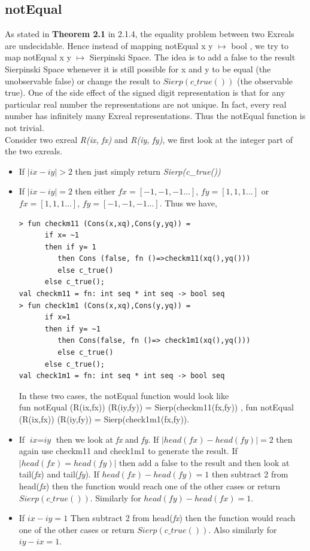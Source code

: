 \documentclass[12pt,twoside,notitlepage]{report}
\begin{document}
\subsection {notEqual}
As stated in \textbf{Theorem 2.1} in 2.1.4, the equality problem between two Exreals are undecidable. Hence instead of mapping notEqual x y $\mapsto$ bool , we try to map notEqual x y $\mapsto$ Sierpinski Space. The idea is to add a false to the result Sierpinski Space whenever it is still possible for x and y to be equal (the unobservable false) or change the result to \textit{$Sierp(c\_true())$} (the observable true). One of the side effect of the signed digit representation is that for any particular real number the representations are not unique. In fact, every real number has infinitely many Exreal representations. Thus the notEqual function is not trivial. \\
Consider two exreal \textit{R(ix, fx)} and \textit{R(iy, fy)}, we first look at the integer part of the two exreals. 
\begin{itemize}
\item If $|\textit{ix}-\textit{iy}| > 2$ then just simply return \textit{Sierp(c\_true())}
\item If $|\textit{ix}-\textit{iy}| = 2$ then either $\textit{fx} = [-1,-1,-1...]$, $\textit{fy} = [1,1,1...]$ or $\textit{fx} = [1,1,1...]$, $\textit{fy} = [-1,-1,-1...]$. 
Thus we have,

{
\begin{verbatim}
> fun checkm11 (Cons(x,xq),Cons(y,yq)) = 
      if x= ~1 
      then if y= 1 
         then Cons (false, fn ()=>checkm11(xq(),yq()))
         else c_true()
      else c_true();
val checkm11 = fn: int seq * int seq -> bool seq
> fun check1m1 (Cons(x,xq),Cons(y,yq)) = 
      if x=1 
      then if y= ~1 
         then Cons(false, fn ()=> check1m1(xq(),yq()))
         else c_true()
      else c_true();
val check1m1 = fn: int seq * int seq -> bool seq
\end{verbatim}
}

In these two cases, the notEqual function would look like \\
fun notEqual (R(ix,fx)) (R(iy,fy)) = Sierp(checkm11(fx,fy)) , fun notEqual (R(ix,fx)) (R(iy,fy)) = Sierp(check1m1(fx,fy)).
\item If $\textit{ix} = \textit{iy}$ then we look at \textit{fx} and \textit{fy}. If $|head(\textit{fx})-head(\textit{fy})| = 2$ then again use checkm11 and check1m1 to generate the result. If $|head(\textit{fx}) = head(\textit{fy})|$ then add a false to the result and then look at tail(\textit{fx}) and tail(\textit{fy}). If $head(\textit{fx})-head(\textit{fy})= 1$ then subtract 2 from head(\textit{fx}) then the function would reach one of the other cases or return \textit{$Sierp(c\_true())$}. Similarly for $head(\textit{fy})-head(\textit{fx})= 1$.
\item If $\textit{ix}-\textit{iy} = 1$ Then subtract 2 from head(\textit{fx}) then the function would reach one of the other cases or return \textit{$Sierp(c\_true())$}. Also similarly for $\textit{iy}-\textit{ix} = 1$.
\end{itemize}
\end{document}
